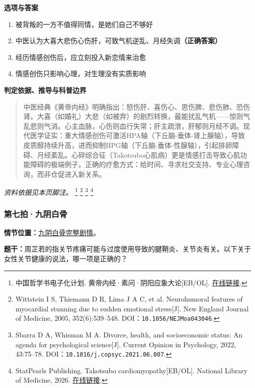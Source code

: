 \textbf{选项与答案}
\begin{enumerate}[label=\Alph*.,leftmargin=*]
  \item 被背叛的一方不值得同情，是她们自己不够好
  \item 中医认为大喜大悲伤心伤肝，可致气机逆乱、月经失调\textbf{（正确答案）}
  \item 经历情感创伤后，应立刻投入新恋情来治愈
  \item 情感创伤只影响心理，对生理没有实质影响
\end{enumerate}
\textbf{判定依据、推导与科普边界}
\begin{quote}中医经典《黄帝内经》明确指出：怒伤肝、喜伤心、思伤脾、悲伤肺、恐伤肾。大喜（如婚礼）大悲（如被弃）的剧烈转换，最能扰乱气机——惊则气乱悲则气消。心主血脉，心伤则血行失常；肝主疏泄，肝郁则月经不调。现代医学证实：重大情感创伤可激活HPA轴（下丘脑-垂体-肾上腺轴），导致皮质醇持续升高，进而抑制HPG轴（下丘脑-垂体-性腺轴），引起排卵障碍、月经紊乱。心碎综合征（Takotsubo心肌病）更是情感打击导致心肌功能障碍的极端例子。正确的疗愈方式：给时间、寻求社交支持、专业心理咨询，而非仓促进入新关系。\end{quote}
\noindent\textit{资料依据见本页脚注。}
\footnote{中国哲学书电子化计划. 黄帝内经·素问·阴阳应象大论[EB/OL]. \href{https://ctext.org/huangdi-neijing/yin-yang-ying-xiang-da-lun/zhs}{在线链接}.}
\footnote{Wittstein I S, Thiemann D R, Lima J A C, et al. Neurohumoral features of myocardial stunning due to sudden emotional stress[J]. New England Journal of Medicine, 2005, 352(6):539–548. DOI：\nolinkurl{10.1056/NEJMoa043046}.}
\footnote{Sbarra D A, Whisman M A. Divorce, health, and socioeconomic status: An agenda for psychological science[J]. Current Opinion in Psychology, 2022, 43:75–78. DOI：\nolinkurl{10.1016/j.copsyc.2021.06.007}.}
\footnote{StatPearls Publishing. Takotsubo cardiomyopathy[EB/OL]. National Library of Medicine, 2026. \href{https://www.ncbi.nlm.nih.gov/books/NBK430798/}{在线链接}.}

\subsubsection{第七拍·九阴白骨}\label{question:zhouzhiruo:7}
\textbf{情节位置：}\hyperref[plot:zhouzhiruo:7]{九阴白骨完整剧情}。

\textbf{题干：}周芷若的指关节疼痛可能与过度使用导致的腱鞘炎、关节炎有关。以下关于女性关节健康的说法，哪一项是正确的？


